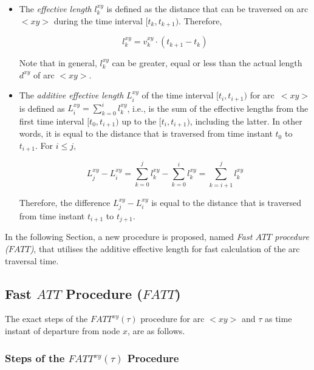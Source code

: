 \documentclass[conference]{IEEEtran}
\begin{document}
\begin{itemize}
    \item The \emph{effective length} $l_k^{xy}$ is defined as the distance that can be traversed on arc $<xy>$ during the time interval $[t_k, t_{k+1})$. Therefore, 
  
\begin{equation}
    l_k^{xy}=v_k^{xy}\cdot(t_{k+1}-t_k) \label{effective1}
\end{equation} 

Note that in general, $l_k^{xy}$ can be greater, equal or less than the actual length $d^{xy}$ of arc $<xy>$.




    \item The \emph{additive effective length} $L_i^{xy}$ of the time interval $[t_i, t_{i+1})$ for arc~$<xy>$ is defined as $L_i^{xy}=\sum_{k=0}^{i}l_k^{xy}$, i.e., is the sum of the effective lengths from the first time interval $[t_0, t_{i+1})$ up to the $[t_i, t_{i+1})$, including the latter. In other words, it is equal to the distance that is traversed from time instant $t_0$ to $t_{i+1}$. For $i\leq j$,
    
\begin{equation}
L_j^{xy}-L_i^{xy}=\sum_{k=0}^{j}l_k^{xy}-\sum_{k=0}^{i}l_k^{xy}=\sum_{k=i+1}^{j}l_k^{xy} \label{eqnld}
\end{equation}

Therefore, the difference $L_j^{xy}-L_i^{xy}$ is equal to the distance that is traversed from time instant $t_{i+1}$ to $t_{j+1}$.  
\end{itemize}

  
In the following Section, a new procedure is proposed, named \emph{Fast $ATT$ procedure ($FATT$)}, that utilises the additive effective length for fast calculation of the arc traversal time. 

\subsection{Fast $ATT$ Procedure ($FATT$)} \label{fattc}

The exact steps of the $FATT^{xy}(\tau)$ procedure for arc $<xy>$ and $\tau$ as time instant of departure from node $x$, are as follows.

\subsubsection{Steps of the $FATT^{xy}(\tau)$ Procedure}
\end{document}
